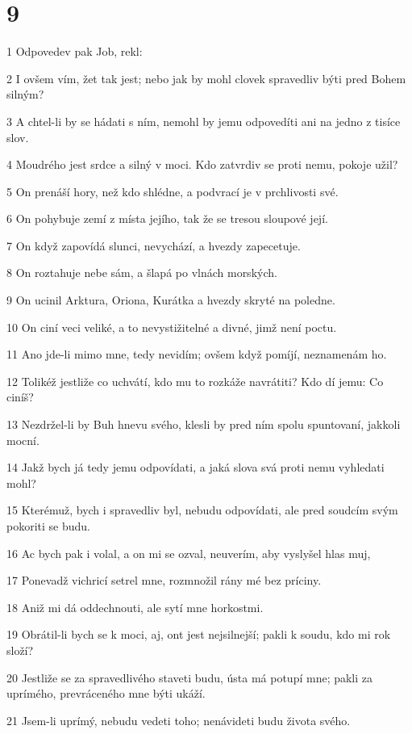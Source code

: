 \chapter{9}

\par 1 Odpovedev pak Job, rekl:
\par 2 I ovšem vím, žet tak jest; nebo jak by mohl clovek spravedliv býti pred Bohem silným?
\par 3 A chtel-li by se hádati s ním, nemohl by jemu odpovedíti ani na jedno z tisíce slov.
\par 4 Moudrého jest srdce a silný v moci. Kdo zatvrdiv se proti nemu, pokoje užil?
\par 5 On prenáší hory, než kdo shlédne, a podvrací je v prchlivosti své.
\par 6 On pohybuje zemí z místa jejího, tak že se tresou sloupové její.
\par 7 On když zapovídá slunci, nevychází, a hvezdy zapecetuje.
\par 8 On roztahuje nebe sám, a šlapá po vlnách morských.
\par 9 On ucinil Arktura, Oriona, Kurátka a hvezdy skryté na poledne.
\par 10 On ciní veci veliké, a to nevystižitelné a divné, jimž není poctu.
\par 11 Ano jde-li mimo mne, tedy nevidím; ovšem když pomíjí, neznamenám ho.
\par 12 Tolikéž jestliže co uchvátí, kdo mu to rozkáže navrátiti? Kdo dí jemu: Co ciníš?
\par 13 Nezdržel-li by Buh hnevu svého, klesli by pred ním spolu spuntovaní, jakkoli mocní.
\par 14 Jakž bych já tedy jemu odpovídati, a jaká slova svá proti nemu vyhledati mohl?
\par 15 Kterémuž, bych i spravedliv byl, nebudu odpovídati, ale pred soudcím svým pokoriti se budu.
\par 16 Ac bych pak i volal, a on mi se ozval, neuverím, aby vyslyšel hlas muj,
\par 17 Ponevadž vichricí setrel mne, rozmnožil rány mé bez príciny.
\par 18 Aniž mi dá oddechnouti, ale sytí mne horkostmi.
\par 19 Obrátil-li bych se k moci, aj, ont jest nejsilnejší; pakli k soudu, kdo mi rok složí?
\par 20 Jestliže se za spravedlivého staveti budu, ústa má potupí mne; pakli za uprímého, prevráceného mne býti ukáží.
\par 21 Jsem-li uprímý, nebudu vedeti toho; nenávideti budu života svého.
